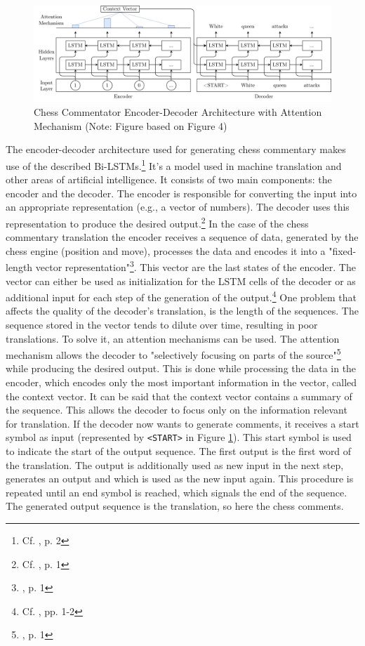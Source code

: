 \begin{figure}[h]
\centering
\includegraphics[width=\textwidth]{graphics/commentator_example/general_approach.png}
\caption{Chess Commentator Encoder-Decoder Architecture with Attention Mechanism (Note: Figure based on \cite{jhamtani-etal-2018-learning} Figure 4)}
\label{fig:eda}
\end{figure}

The encoder-decoder architecture used for generating chess commentary makes use of the described Bi-LSTMs.\footnote{Cf. \cite{zang-etal-2019-automated}, p. 2}  It’s a model used in machine translation and other areas of artificial intelligence. It consists of two main components: the encoder and the decoder. The encoder is responsible for converting the input into an appropriate representation (e.g., a vector of numbers). The decoder uses this representation to produce the desired output.\footnote{Cf. \cite{https://doi.org/10.48550/arxiv.1406.1078}, p. 1} In the case of the chess commentary translation the encoder receives a sequence of data, generated by the chess engine (position and move), processes the data and encodes it  into a "fixed-length vector representation"\footnote{\cite{cho-2014-ende}, p. 1}. This vector are the last states of the encoder. The vector can either be used as initialization for the LSTM cells of the decoder or as additional input for each step of the generation of the output.\footnote{Cf. \cite{mohajerin-2017-state}, pp. 1-2} One problem that affects the quality of the decoder’s translation, is the length of the sequences. The sequence stored in the vector tends to dilute over time, resulting in poor translations. To solve it, an attention mechanisms can be used. The attention mechanism allows the decoder to "selectively focusing on parts of the source"\footnote{\cite{luong-2015-attention}, p. 1} while producing the desired output. This is done while processing the data in the encoder, which encodes only the most important information in the vector, called the context vector. It can be said that the context vector contains a summary of the sequence. This allows the decoder to focus only on the information relevant for translation. If the decoder now wants to generate comments, it receives a start symbol as input (represented by \texttt{<START>} in Figure \ref{fig:eda}). This start symbol is used to indicate the start of the output sequence. The first output is the first word of the translation. The output is additionally used as new input in the next step, generates an output and which is used as the new input again. This procedure is repeated until an end symbol is reached, which signals the end of the sequence. The generated output sequence is the translation, so here the chess comments.
